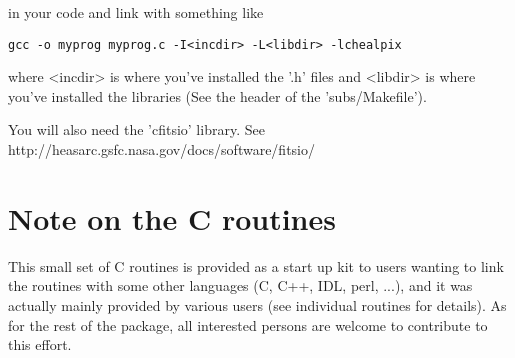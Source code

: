 \documentclass[12pt,twoside]{article}
\begin{document}
in your code and link with something like 
 
{\tt gcc -o myprog myprog.c -I<incdir> -L<libdir> -lchealpix}

where <incdir> is where you've installed the '.h' files and 
<libdir> is where you've installed the libraries (See the header of 
the 'subs/Makefile').

You will also need the 'cfitsio' library. See 
			{http://heasarc.gsfc.nasa.gov/docs/software/fitsio/}

\section[Note on the C routines]{{\Large Note on the C routines}}
This small set of C routines is provided as a start up kit to users wanting to
link the \healpix routines with some other languages (C, C++, IDL, perl, ...),
and it was actually mainly provided by various users (see individual routines
for details). As for the rest of the
\healpix package, all interested persons are welcome to contribute to this effort.

\newpage







\end{document}
